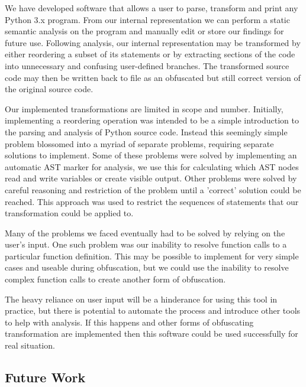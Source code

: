 \documentclass[twoside,a4paper]{report}
\begin{document}
We have developed software that allows a user to parse, transform and print any Python 3.x program. From our internal representation we can perform a static
semantic analysis on the program and manually edit or store our findings for future use. Following analysis, our internal representation may be transformed
by either reordering a subset of its statements or by extracting sections of the code into unnecessary and confusing user-defined branches. The transformed
source code may then be written back to file as an obfuscated but still correct version of the original source code.

Our implemented transformations are limited in scope and number. Initially, implementing a reordering operation was intended to be a simple introduction
to the parsing and analysis of Python source code. Instead this seemingly simple problem blossomed into a myriad of separate problems, requiring separate
solutions to implement. Some of these problems were solved by implementing an automatic AST marker for analysis, we use this for calculating which AST nodes
read and write variables or create visible output. Other problems were solved by careful reasoning and restriction of the problem until a 'correct' solution
could be reached. This approach was used to restrict the sequences of statements that our transformation could be applied to.

Many of the problems we faced eventually had to be solved by relying on the user's input. One such problem was our inability to resolve function calls to a
particular function definition. This may be possible to implement for very simple cases and useable during obfuscation, but we could use the inability to
resolve complex function calls to create another form of obfuscation.

The heavy reliance on user input will be a hinderance for using this tool in practice, but there is potential to automate the process and introduce other
tools to help with analysis. If this happens and other forms of obfuscating transformation are implemented then this software could be used successfully
for real situation.

\subsection{Future Work}



\end{document}
